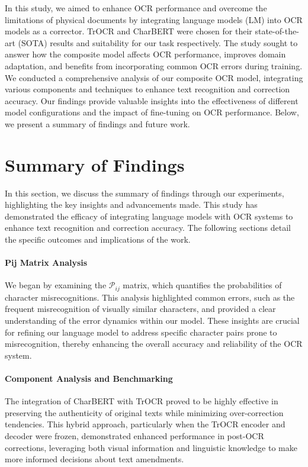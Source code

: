 \label{chap:6_conclusion}
In this study, we aimed to enhance OCR performance and overcome the limitations of physical documents by integrating language models (LM) into OCR models as a corrector. TrOCR and CharBERT were chosen for their state-of-the-art (SOTA) results and suitability for our task respectively. The study sought to answer how the composite model affects OCR performance, improves domain adaptation, and benefits from incorporating common OCR errors during training. We conducted a comprehensive analysis of our composite OCR model, integrating various components and techniques to enhance text recognition and correction accuracy. Our findings provide valuable insights into the effectiveness of different model configurations and the impact of fine-tuning on OCR performance. Below, we present a summary of findings and future work.

\section{Summary of Findings}
In this section, we discuss the summary of findings through our experiments, highlighting the key insights and advancements made. This study has demonstrated the efficacy of integrating language models with OCR systems to enhance text recognition and correction accuracy. The following sections detail the specific outcomes and implications of the work.

\paragraph*{Pij Matrix Analysis}
We began by examining the $\mathcal{P}_{ij}$ matrix, which quantifies the probabilities of character misrecognitions. This analysis highlighted common errors, such as the frequent misrecognition of visually similar characters, and provided a clear understanding of the error dynamics within our model. These insights are crucial for refining our language model to address specific character pairs prone to misrecognition, thereby enhancing the overall accuracy and reliability of the OCR system.

\paragraph*{Component Analysis and Benchmarking}
The integration of CharBERT with TrOCR proved to be highly effective in preserving the authenticity of original texts while minimizing over-correction tendencies. This hybrid approach, particularly when the TrOCR encoder and decoder were frozen, demonstrated enhanced performance in post-OCR corrections, leveraging both visual information and linguistic knowledge to make more informed decisions about text amendments.

